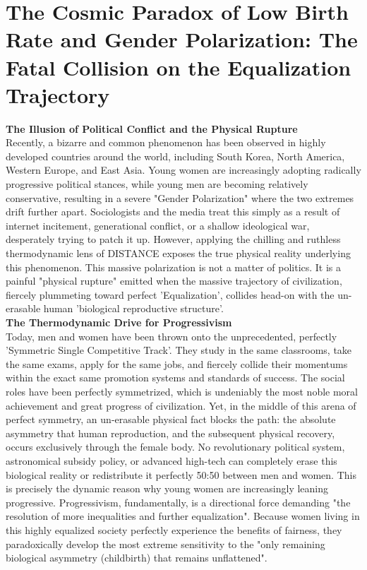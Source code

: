 

\section{The Cosmic Paradox of Low Birth Rate and Gender Polarization: The Fatal Collision on the Equalization Trajectory}
\textbf{The Illusion of Political Conflict and the Physical Rupture} \\
Recently, a bizarre and common phenomenon has been observed in highly developed countries around the world, including South Korea, North America, Western Europe, and East Asia. Young women are increasingly adopting radically progressive political stances, while young men are becoming relatively conservative, resulting in a severe "Gender Polarization" where the two extremes drift further apart. Sociologists and the media treat this simply as a result of internet incitement, generational conflict, or a shallow ideological war, desperately trying to patch it up.
However, applying the chilling and ruthless thermodynamic lens of DISTANCE exposes the true physical reality underlying this phenomenon. This massive polarization is not a matter of politics. It is a painful "physical rupture" emitted when the massive trajectory of civilization, fiercely plummeting toward perfect 'Equalization', collides head-on with the un-erasable human 'biological reproductive structure'. \\
\textbf{The Thermodynamic Drive for Progressivism} \\
Today, men and women have been thrown onto the unprecedented, perfectly 'Symmetric Single Competitive Track'. They study in the same classrooms, take the same exams, apply for the same jobs, and fiercely collide their momentums within the exact same promotion systems and standards of success. The social roles have been perfectly symmetrized, which is undeniably the most noble moral achievement and great progress of civilization.
Yet, in the middle of this arena of perfect symmetry, an un-erasable physical fact blocks the path: the absolute asymmetry that human reproduction, and the subsequent physical recovery, occurs exclusively through the female body. No revolutionary political system, astronomical subsidy policy, or advanced high-tech can completely erase this biological reality or redistribute it perfectly 50:50 between men and women.
This is precisely the dynamic reason why young women are increasingly leaning progressive. Progressivism, fundamentally, is a directional force demanding "the resolution of more inequalities and further equalization". Because women living in this highly equalized society perfectly experience the benefits of fairness, they paradoxically develop the most extreme sensitivity to the "only remaining biological asymmetry (childbirth) that remains unflattened".

